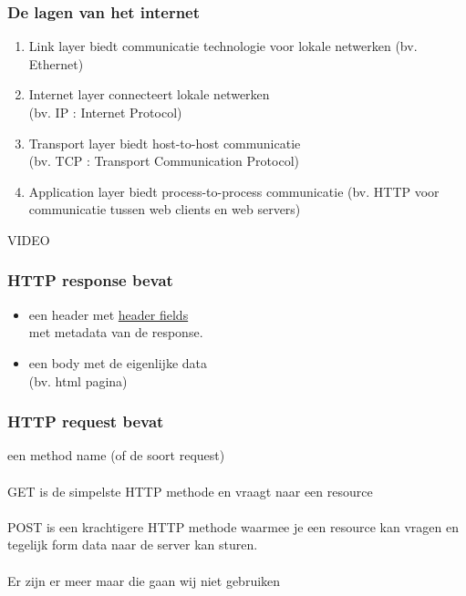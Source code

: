 \documentclass{beamer}
\begin{document}
\begin{frame}

\frametitle{De lagen van het internet}

{\Large \begin{enumerate}
  \item Link layer biedt communicatie technologie voor lokale netwerken (bv. Ethernet)
  \item Internet layer connecteert lokale netwerken \\(bv. IP : Internet Protocol)
  \item Transport layer biedt host-to-host communicatie \\(bv. TCP : Transport Communication Protocol)
  \item Application layer biedt process-to-process communicatie (bv. HTTP voor communicatie tussen web clients en web servers)
\end{enumerate}}

\end{frame}


\begin{frame}

\begin{center}
{\Huge VIDEO}
\end{center}

\end{frame}


\begin{frame}

\frametitle{HTTP response bevat}

{\LARGE \begin{itemize}
  \item een header met \href{https://en.wikipedia.org/wiki/List_of_HTTP_header_fields}{header fields} \\met metadata van de response.
  \item een body met de eigenlijke data \\(bv. html pagina)
\end{itemize}}

\end{frame}


\begin{frame}

\frametitle{HTTP request bevat}

{\Large een method name (of de soort request)\\~\\

GET is de simpelste HTTP methode en vraagt naar een resource\\~\\
POST is een krachtigere HTTP methode waarmee je een resource kan vragen en tegelijk form data naar de server kan sturen.\\~\\
Er zijn er meer maar die gaan wij niet gebruiken}

\end{frame}
\end{document}
